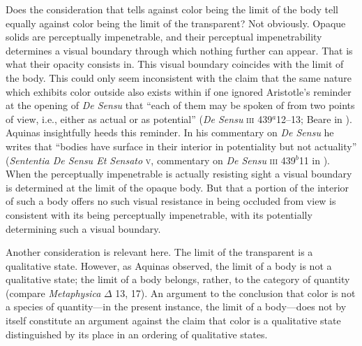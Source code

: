 \label{actual_potential} Does the consideration that tells against color being the limit of the body tell equally against color being the limit of the transparent? Not obviously. Opaque solids are perceptually impenetrable, and their perceptual impenetrability determines a visual boundary through which nothing further can appear. That is what their opacity consists in. This visual boundary coincides with the limit of the body. This could only seem inconsistent with the claim that the same nature which exhibits color outside also exists within if one ignored Aristotle's reminder at the opening of \emph{De Sensu} that ``each of them may be spoken of from two points of view, i.e., either as actual or as potential'' (\emph{De Sensu} \textsc{iii} 439\( ^{a} \)12--13; Beare in \citealt[7]{Barnes:1984uq}). Aquinas insightfully heeds this reminder. In his commentary on \emph{De Sensu} he writes that ``bodies have surface in their interior in potentiality but not actuality'' (\emph{Sententia De Sensu Et Sensato} \textsc{v}, commentary on \emph{De Sensu} \textsc{iii} 439\( ^{b} \)11 in \citealt{White:2005vn}). When the perceptually impenetrable is actually resisting sight a visual boundary is determined at the limit of the opaque body. But that a portion of the interior of such a body offers no such visual resistance in being occluded from view is consistent with its being perceptually impenetrable, with its potentially determining such a visual boundary.

Another consideration is relevant here. The limit of the transparent is a qualitative state. However, as Aquinas observed, the limit of a body is not a qualitative state; the limit of a body belongs, rather, to the category of quantity (compare \emph{Metaphysica} \( \Delta \) 13, 17). An argument to the conclusion that color is not a species of quantity---in the present instance, the limit of a body---does not by itself constitute an argument against the claim that color is a qualitative state distinguished by its place in an ordering of qualitative states.

